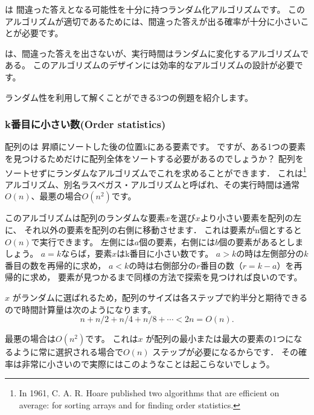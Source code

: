 
 は
間違った答えとなる可能性を十分に持つランダム化アルゴリズムです。
このアルゴリズムが適切であるためには、間違った答えが出る確率が十分に小さいことが必要です。


は、間違った答えを出さないが、実行時間はランダムに変化するアルゴリズムである。
このアルゴリズムのデザインには効率的なアルゴリズムの設計が必要です。

ランダム性を利用して解くことができる3つの例題を紹介します。

\subsubsection{k番目に小さい数(Order statistics)}


配列のは
昇順にソートした後の位置kにある要素です。
ですが、ある1つの要素を見つけるためだけに配列全体をソートする必要があるのでしょうか？
配列をソートせずにランダムなアルゴリズムでこれを求めることができます．
これは\footnote{In 1961,
C. A. R. Hoare published two algorithms that
are efficient on average:  
 \cite{hoa61a} for sorting arrays and
 \cite{hoa61b} for finding order statistics.}
アルゴリズム、別名ラスベガス・アルゴリズムと呼ばれ、その実行時間は通常$O(n)$、最悪の場合$O(n^2)$です。

このアルゴリズムは配列のランダムな要素$x$を選び$x$より小さい要素を配列の左に、
それ以外の要素を配列の右側に移動させます．
これは要素がn個とすると$O(n)$で実行できます。
左側には$a$個の要素，右側には$b$個の要素があるとしましょう。
$a = k$ならば，要素$x$はk番目に小さい数です。
$a > k$の時は左側部分の$k$番目の数を再帰的に求め，
$a < k$の時は右側部分の$r$番目の数$（r = k - a）$を再帰的に求め，
要素が見つかるまで同様の方法で探索を見つければ良いのです。

$x$ がランダムに選ばれるため，配列のサイズは各ステップで約半分と期待できるので時間計算量は次のようになります。
\[n+n/2+n/4+n/8+\cdots < 2n = O(n).\]

最悪の場合は$O(n^2)$です。
これは$x$ が配列の最小または最大の要素の1つになるように常に選択される場合で$O(n)$ ステップが必要になるからです．
その確率は非常に小さいので実際にはこのようなことは起こらないでしょう。

